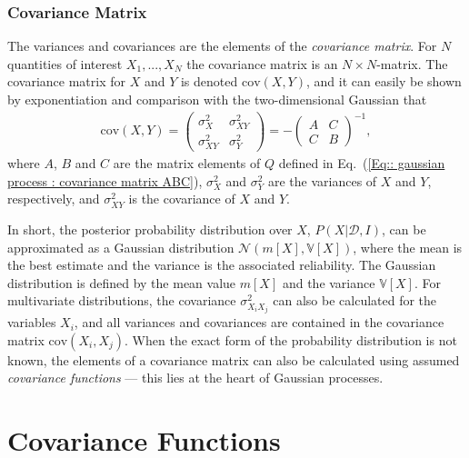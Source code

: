 \documentclass[twoside,english]{uiofysmaster}
\begin{document}
{{\subsubsection{Covariance Matrix}

The variances and covariances are the elements of the \textit{covariance matrix}. For $N$ quantities of interest $X_1, ...,X_N$ the covariance matrix is an $N \times N$-matrix. The covariance matrix for $X$ and $Y$ is denoted $\text{cov}(X,Y)$, and it can easily be shown by exponentiation and comparison with the two-dimensional Gaussian that \cite{sivia2006data}
\begin{align}
\text{cov}(X,Y) = 
\begin{pmatrix}
\sigma_X^2 & \sigma_{XY}^2\\
\sigma_{XY}^2 & \sigma_Y^2
\end{pmatrix}
= - \begin{pmatrix}
A & C\\
C & B
\end{pmatrix}^{-1},
\end{align}
where $A$, $B$ and $C$ are the matrix elements of $Q$ defined in Eq.~(\ref{Eq:: gaussian process : covariance matrix ABC}),  $\sigma_X^2$ and $\sigma_Y^2$ are the variances of $X$ and $Y$, respectively, and $\sigma_{XY}^2$ is the covariance of $X$ and $Y$.

In short, the posterior probability distribution over $X$, $P(X | \mathcal{D}, I)$, can be approximated as a Gaussian distribution $\mathcal{N}(m[X], \mathbb{V}[X])$, where the mean is the best estimate and the variance is the associated reliability. The Gaussian distribution is defined by the mean value $m[X]$ and the variance $\mathbb{V}[X]$. For multivariate distributions, the covariance $\sigma_{X_i X_j}^2$ can also be calculated for the variables $X_i$, and all variances and covariances are contained in the covariance matrix $\text{cov}(X_i, X_j)$. When the exact form of the probability distribution is not known, the elements of a covariance matrix can also be calculated using assumed \textit{covariance functions} --- this lies at the heart of Gaussian processes.



\section{Covariance Functions}\label{Sec:: gaussian processes : Covariance functions}


}}
\end{document}
